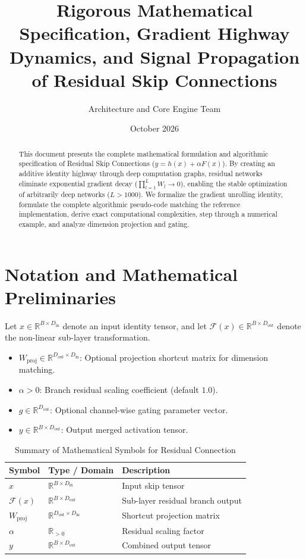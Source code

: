\documentclass[11pt,a4paper]{article}
\title{\textbf{Rigorous Mathematical Specification, Gradient Highway Dynamics, and Signal Propagation of Residual Skip Connections}}
\author{Architecture and Core Engine Team}
\date{October 2026}
\theoremstyle{definition}
\begin{document}
\maketitle

\begin{abstract}
This document presents the complete mathematical formulation and algorithmic specification of Residual Skip Connections ($y = h(x) + \alpha F(x)$). By creating an additive identity highway through deep computation graphs, residual networks eliminate exponential gradient decay ($\prod_{l=1}^L W_l \to 0$), enabling the stable optimization of arbitrarily deep networks ($L > 1000$). We formalize the gradient unrolling identity, formulate the complete algorithmic pseudo-code matching the reference implementation, derive exact computational complexities, step through a numerical example, and analyze dimension projection and gating.
\end{abstract}

\section{Notation and Mathematical Preliminaries}

Let $x \in \mathbb{R}^{B \times D_{\text{in}}}$ denote an input identity tensor, and let $\mathcal{F}(x) \in \mathbb{R}^{B \times D_{\text{out}}}$ denote the non-linear sub-layer transformation.

\begin{itemize}
    \item $W_{\text{proj}} \in \mathbb{R}^{D_{\text{out}} \times D_{\text{in}}}$: Optional projection shortcut matrix for dimension matching.
    \item $\alpha > 0$: Branch residual scaling coefficient (default $1.0$).
    \item $g \in \mathbb{R}^{D_{\text{out}}}$: Optional channel-wise gating parameter vector.
    \item $y \in \mathbb{R}^{B \times D_{\text{out}}}$: Output merged activation tensor.
\end{itemize}

\begin{table}[h]
\centering
\caption{Summary of Mathematical Symbols for Residual Connection}
\begin{tabular}{lll}
\toprule
\textbf{Symbol} & \textbf{Type / Domain} & \textbf{Description} \\
\midrule
$x$ & $\mathbb{R}^{B \times D_{\text{in}}}$ & Input skip tensor \\
$\mathcal{F}(x)$ & $\mathbb{R}^{B \times D_{\text{out}}}$ & Sub-layer residual branch output \\
$W_{\text{proj}}$ & $\mathbb{R}^{D_{\text{out}} \times D_{\text{in}}}$ & Shortcut projection matrix \\
$\alpha$ & $\mathbb{R}_{> 0}$ & Residual scaling factor \\
$y$ & $\mathbb{R}^{B \times D_{\text{out}}}$ & Combined output tensor \\
\bottomrule
\end{tabular}
\end{table}
\end{document}
